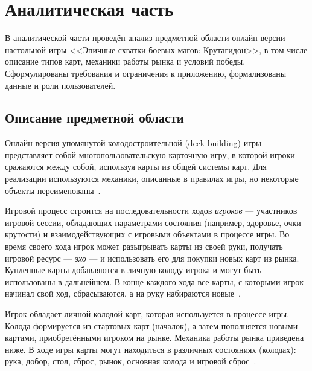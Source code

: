 \chapter{Аналитическая часть}

В аналитической части проведён анализ предметной области онлайн-версии
настольной игры <<Эпичные схватки боевых магов: Крутагидон>>, в том числе
описание типов карт, механики работы рынка и условий победы. Сформулированы
требования и ограничения к приложению, формализованы данные и роли
пользователей.

\section{Описание предметной области}

Онлайн-версия упомянутой колодостроительной (deck-building) игры представляет
собой многопользовательскую карточную игру, в которой игроки сражаются между
собой, используя карты из общей системы карт. Для реализации используются
механики, описанные в правилах игры, но некоторые объекты
переименованы~\cite{rules}.

Игровой процесс строится на последовательности ходов \textit{игроков} ---
участников игровой сессии, обладающих параметрами состояния (например,
здоровье, очки крутости) и взаимодействующих с игровыми объектами в процессе
игры. Во время своего хода игрок может разыгрывать карты из своей руки,
получать игровой ресурс --- \textit{эхо} --- и использовать его для покупки
новых карт из рынка. Купленные карты добавляются в личную колоду игрока и могут
быть использованы в дальнейшем. В конце каждого хода все карты, с которыми
игрок начинал свой ход, сбрасываются, а на руку набираются новые~\cite{rules}.

Игрок обладает личной колодой карт, которая используется в процессе игры.
Колода формируется из стартовых карт (началок), а затем пополняется новыми
картами, приобретёнными игроком на рынке. Механика работы рынка приведена ниже.
В ходе игры карты могут находиться в различных состояниях (колодах): рука,
добор, стол, сброс, рынок, основная колода и игровой сброс~\cite{rules}.

